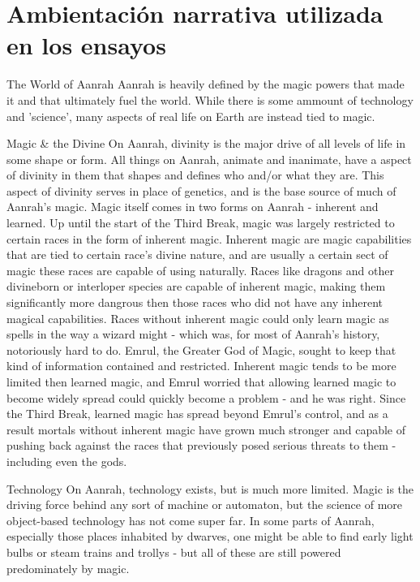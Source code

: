 
\chapter{Ambientación narrativa utilizada en los ensayos}
\label{AppendixB} %
The World of Aanrah
Aanrah is heavily defined by the magic powers that made it and that ultimately fuel the world. While there is some ammount of technology and 'science', many aspects of real life on Earth are instead tied to magic.

Magic \& the Divine
On Aanrah, divinity is the major drive of all levels of life in some shape or form. All things on Aanrah, animate and inanimate, have a aspect of divinity in them that shapes and defines who and/or what they are. This aspect of divinity serves in place of genetics, and is the base source of much of Aanrah's magic.
Magic itself comes in two forms on Aanrah - inherent and learned. Up until the start of the Third Break, magic was largely restricted to certain races in the form of inherent magic. Inherent magic are magic capabilities that are tied to certain race's divine nature, and are usually a certain sect of magic these races are capable of using naturally. Races like dragons and other divineborn or interloper species are capable of inherent magic, making them significantly more dangrous then those races who did not have any inherent magical capabilities. Races without inherent magic could only learn magic as spells in the way a wizard might - which was, for most of Aanrah's history, notoriously hard to do. Emrul, the Greater God of Magic, sought to keep that kind of information contained and restricted. Inherent magic tends to be more limited then learned magic, and Emrul worried that allowing learned magic to become widely spread could quickly become a problem - and he was right. Since the Third Break, learned magic has spread beyond Emrul's control, and as a result mortals without inherent magic have grown much stronger and capable of pushing back against the races that previously posed serious threats to them - including even the gods.

Technology
On Aanrah, technology exists, but is much more limited. Magic is the driving force behind any sort of machine or automaton, but the science of more object-based technology has not come super far. In some parts of Aanrah, especially those places inhabited by dwarves, one might be able to find early light bulbs or steam trains and trollys - but all of these are still powered predominately by magic.

